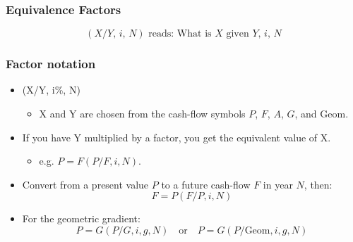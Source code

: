     \subsubsection{Equivalence Factors}
    \begin{definition}
        \[
        \left(X/Y, \, i, \, N\right) \text{ reads: } \text{What is } X \text{ given } Y, \, i, \, N
        \]
    \end{definition}

    \subsubsection{Factor notation}
    \begin{definition}
        \begin{itemize}
            \item (X/Y, i\%, N) 
            \begin{itemize}
                \item X and Y are chosen from the cash-flow symbols \( P \), \( F \), \( A \), \( G \), and Geom.
            \end{itemize}
            \item If you have Y multiplied by a factor, you get the equivalent value of X. 
            \begin{itemize}
                \item e.g. \( P = F(P/F, i, N) \).
            \end{itemize}
            \item Convert from a present value \( P \) to a future cash-flow \( F \) in year \( N \), then:
            \[
            F = P(F/P, i, N)
            \]
            \item For the geometric gradient:
            \[
            P = G(P/G, i, g, N) \quad \text{or} \quad P = G(P/\text{Geom}, i, g, N)
            \]
        \end{itemize}
    \end{definition}

